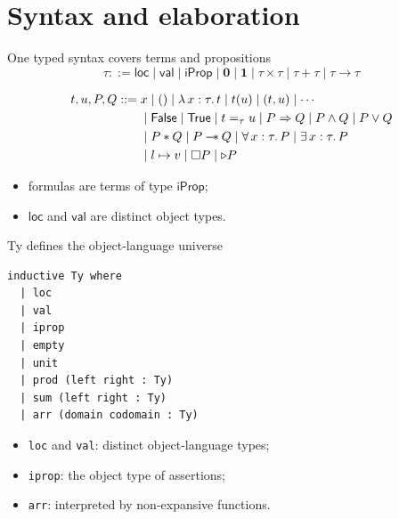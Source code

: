 \documentclass[10pt,aspectratio=169]{beamer}
\begin{document}
\section{Syntax and elaboration}

\begin{frame}{One typed syntax covers terms and propositions}
  \[
    \tau ::= \mathsf{loc}\mid\mathsf{val}\mid\mathsf{iProp}\mid
    \mathbf 0\mid\mathbf 1\mid\tau\times\tau\mid\tau+\tau\mid\tau\to\tau
  \]

  \[
    \begin{aligned}
    t,u,P,Q ::= {}&x\mid()\mid\lambda\,x : \tau.\, t\mid t(u)\mid(t,u)\mid\cdots\\
      &\mid\mathsf{False}\mid\mathsf{True}\mid t =_{\tau} u\mid P\Rightarrow Q\mid P\land Q\mid P\lor Q\\
      &\mid P\mathbin{*} Q\mid P\mathbin{-\!*} Q\mid\forall\,x : \tau.\, P\mid\exists\,x : \tau.\, P\\
      &\mid l\mapsto v\mid\mathord{\Box} P\mid\mathord{\triangleright} P
    \end{aligned}
  \]

  \begin{itemize}
    \item formulas are terms of type $\mathsf{iProp}$;
    \item $\mathsf{loc}$ and $\mathsf{val}$ are distinct object types.
  \end{itemize}
\end{frame}

\begin{frame}[fragile]{Ty defines the object-language universe}
\begin{lstlisting}[style=leancode]
inductive Ty where
  | loc
  | val
  | iprop
  | empty
  | unit
  | prod (left right : Ty)
  | sum (left right : Ty)
  | arr (domain codomain : Ty)
\end{lstlisting}

  \begin{itemize}
    \item \texttt{loc} and \texttt{val}: distinct object-language types;
    \item \texttt{iprop}: the object type of assertions;
    \item \texttt{arr}: interpreted by non-expansive functions.
  \end{itemize}
\end{frame}
\end{document}
